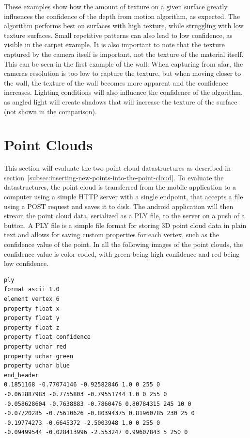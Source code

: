 These examples show how the amount of texture on a given surface greatly influences the confidence of the depth from motion algorithm, as expected.
The algorithm performs best on surfaces with high texture, while struggling with low texture surfaces.
Small repetitive patterns can also lead to low confidence, as visible in the carpet example.
It is also important to note that the texture captured by the camera itself is important, not the texture of the material itself.
This can be seen in the first example of the wall: When capturing from afar, the cameras resolution is too low to capture the texture,
but when moving closer to the wall, the texture of the wall becomes more apparent and the confidence increases.
Lighting conditions will also influence the confidence of the algorithm,
as angled light will create shadows that will increase the texture of the surface~\cite{google_llc_arcore_doc} (not shown in the comparison).

\section{Point Clouds}\label{sec:point-clouds}
This section will evaluate the two point cloud datastructures as described in section~\ref{subsec:inserting-new-points-into-the-point-cloud}.
To evaluate the datastructures, the point cloud is transferred from the mobile application to a computer using
a simple HTTP server with a single endpoint, that accepts a file using a POST request and saves it to disk.
The android application will then stream the point cloud data, serialized as a PLY file, to the server on a push of a button.
A PLY file is a simple file format for storing 3D point cloud data in plain text
and allows for saving custom properties for each vertex, such as the confidence value of the point.
In all the following images of the point clouds, the confidence value is color-coded,
with green being high confidence and red being low confidence.

\begin{lstlisting}[caption=Example PLY file]
ply
format ascii 1.0
element vertex 6
property float x
property float y
property float z
property float confidence
property uchar red
property uchar green
property uchar blue
end_header
0.1851168 -0.77074146 -0.92582846 1.0 0 255 0
-0.061887983 -0.7755803 -0.79551744 1.0 0 255 0
-0.058628604 -0.7638883 -0.7860476 0.80784315 245 10 0
-0.07720285 -0.75610626 -0.80394375 0.81960785 230 25 0
-0.19774273 -0.6645372 -2.5003948 1.0 0 255 0
-0.09499544 -0.028413996 -2.553247 0.99607843 5 250 0
\end{lstlisting}

